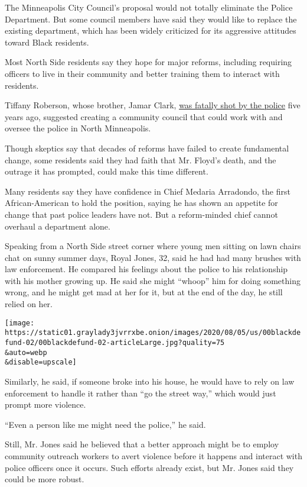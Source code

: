 The Minneapolis City Council's proposal would not totally eliminate the
Police Department. But some council members have said they would like to
replace the existing department, which has been widely criticized for
its aggressive attitudes toward Black residents.

Most North Side residents say they hope for major reforms, including
requiring officers to live in their community and better training them
to interact with residents.

Tiffany Roberson, whose brother, Jamar Clark,
\href{https://www.nytimes3xbfgragh.onion/2016/03/31/us/jamar-clark-shooting-minneapolis.html}{was
fatally shot by the police} five years ago, suggested creating a
community council that could work with and oversee the police in North
Minneapolis.

Though skeptics say that decades of reforms have failed to create
fundamental change, some residents said they had faith that Mr. Floyd's
death, and the outrage it has prompted, could make this time different.

Many residents say they have confidence in Chief Medaria Arradondo, the
first African-American to hold the position, saying he has shown an
appetite for change that past police leaders have not. But a
reform-minded chief cannot overhaul a department alone.

Speaking from a North Side street corner where young men sitting on lawn
chairs chat on sunny summer days, Royal Jones, 32, said he had had many
brushes with law enforcement. He compared his feelings about the police
to his relationship with his mother growing up. He said she might
``whoop'' him for doing something wrong, and he might get mad at her for
it, but at the end of the day, he still relied on her.

\texttt{[image: https://static01.graylady3jvrrxbe.onion/images/2020/08/05/us/00blackdefund-02/00blackdefund-02-articleLarge.jpg?quality=75\\\&auto=webp\\\&disable=upscale]}

Similarly, he said, if someone broke into his house, he would have to
rely on law enforcement to handle it rather than ``go the street way,''
which would just prompt more violence.

``Even a person like me might need the police,'' he said.

Still, Mr. Jones said he believed that a better approach might be to
employ community outreach workers to avert violence before it happens
and interact with police officers once it occurs. Such efforts already
exist, but Mr. Jones said they could be more robust.

